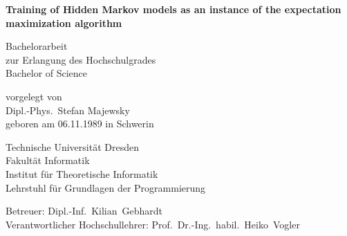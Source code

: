 \documentclass[
 paper=A4,pagesize=automedia,fontsize=12pt,
 BCOR=10mm,DIV=16,
 twoside,headinclude,footinclude=false,
 bibtotocnumbered,          %
 liststotoc,                %
 listsleft,
 pointlessnumbers,          %
 cleardoublepage=empty      %
]{scrbook}
\theoremstyle{plain}
\theoremstyle{definition}
\numberwithin{theorem}{chapter}
\numberwithin{equation}{chapter}
\numberwithin{figure}{chapter}
\numberwithin{table}{chapter}
\begin{document}
\frontmatter

\begin{titlepage}
 \begin{center}
  \vspace*{4em}

  \begin{singlespace}\bfseries\Huge
   Training of Hidden Markov models as an instance of the expectation maximization algorithm
  \end{singlespace}

  \vspace*{4em}

  \begin{singlespace}\large
   Bachelorarbeit \\ zur Erlangung des Hochschulgrades \\ Bachelor of Science
  \end{singlespace}\medskip

  \vspace*{3em}

  vorgelegt von \\
  {\large Dipl.-Phys.~Stefan Majewsky} \\
  geboren am 06.11.1989 in Schwerin

  \vspace*{3em}

  \begin{singlespace}\large
   Technische Universität Dresden \\
   Fakultät Informatik \\
   Institut für Theoretische Informatik \\
   Lehrstuhl für Grundlagen der Programmierung
  \end{singlespace}

  \vspace*{3em}

  \begin{singlespace}
   Betreuer: Dipl.-Inf.~Kilian~Gebhardt \\
   Verantwortlicher Hochschullehrer: Prof.~Dr.-Ing.~habil.~Heiko~Vogler
  \end{singlespace}

 \end{center}


\end{titlepage}
\end{document}
